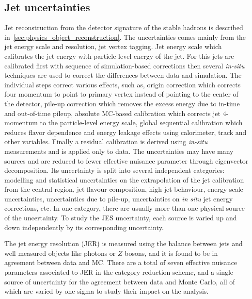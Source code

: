 \subsection*{Jet uncertainties}
Jet reconstruction from the detector signature of the stable hadrons is described in~\cref{sec:physics_object_reconstruction}. The uncertainties comes mainly from the jet energy scale and resolution, jet vertex tagging. Jet energy scale which calibrates the jet energy with particle level energy of the jet. For this jets are calibrated first with sequence of simulation-based corrections then several \emph{in-situ} techniques are used to correct the differences between data and simulation. The individual steps correct various effects, such as, origin correction which corrects four momentum to point to primary vertex instead of pointing to the center of the detector, pile-up correction which removes the excess energy due to in-time and out-of-time pileup, absolute MC-based calibration which corrects jet 4-momentum to the particle-level energy scale, global sequential calibration which reduces flavor dependence and energy leakage effects using calorimeter, track and other variables. Finally a residual calibration is derived using \emph{in-situ} measurements and is applied only to data. The uncertainties may have many sources and are reduced to fewer effective nuisance parameter through eigenvector decomposition. Its uncertainty is split into several independent categories: modelling and statistical uncertainties on the extrapolation of the jet calibration from the central region, jet flavour composition, high-\pT jet behaviour, \bjet energy scale uncertainties, uncertainties due to pile-up, uncertainties on \textit{in situ} jet energy corrections, etc. In one category, there are usually more than one physical source of the uncertainty. To study the JES uncertainty, each source is varied up and down independently by its corresponding uncertainty. 

The jet energy resolution (JER) is measured using the balance between jets and well measured objects like photons or $Z$ bosons, and it is found to be in agreement between data and MC. There are a total of seven effective nuisance parameters associated to JER in the category reduction scheme, and a single source of uncertainty for the agreement between data and Monte Carlo, all of which are varied by one sigma to study their impact on the analysis.

